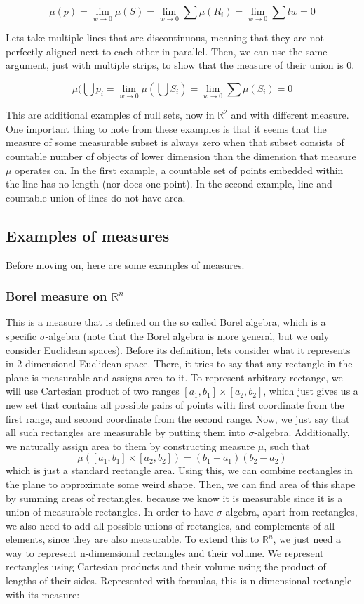 \documentclass{article}
\begin{document}
\[\mu(p)=\lim_{w \to 0}\mu(S)=\lim_{w \to 0}\sum\mu(R_i)=\lim_{w \to 0}\sum lw=0\]

Lets take multiple lines that are discontinuous, meaning that they are not perfectly aligned next to each other in parallel. Then, we can use the same argument, just with multiple strips, to show that the measure of their union is 0.

\[ \mu(\bigcup p_i = \lim_{w \to 0}\mu(\bigcup S_i) = \lim_{w \to 0}\sum\mu(S_i) = 0 \]

This are additional examples of null sets, now in $\mathbb{R}^2$ and with different measure. One important thing to note from these examples is that it seems that the measure of some measurable subset is always zero when that subset consists of countable number of objects of lower dimension than the dimension that measure $\mu$ operates on. In the first example, a countable set of points embedded within the line has no length (nor does one point). In the second example, line and countable union of lines do not have area. 

\subsection{Examples of measures}

Before moving on, here are some examples of measures.

\subsubsection{Borel measure on $\mathbb{R}^n$}
This is a measure that is defined on the so called Borel algebra, which is a specific $\sigma$-algebra (note that the Borel algebra is more general, but we only consider Euclidean spaces). Before its definition, lets consider what it represents in 2-dimensional Euclidean space. There, it tries to say that any rectangle in the plane is measurable and assigns area to it. To represent arbitrary rectange, we will use Cartesian product of two ranges $[a_1, b_1]\times[a_2, b_2]$, which just gives us a new set that contains all possible pairs of points with first coordinate from the first range, and second coordinate from the second range. Now, we just say that all such rectangles are measurable by putting them into $\sigma$-algebra. Additionally, we naturally assign area to them by constructing measure $\mu$, such that
\[\mu([a_1, b_1]\times[a_2, b_2])=(b_1-a_1)(b_2-a_2)\]
which is just a standard rectangle area. Using this, we can combine rectangles in the plane to approximate some weird shape. Then, we can find area of this shape by summing areas of rectangles, because we know it is measurable since it is a union of measurable rectangles. In order to have $\sigma$-algebra, apart from rectangles, we also need to add all possible unions of rectangles, and complements of all elements, since they are also measurable.
\newline\indent To extend this to $\mathbb{R}^n$, we just need a way to represent n-dimensional rectangles and their volume. We represent rectangles using Cartesian products and their volume using the product of lengths of their sides. Represented with formulas, this is n-dimensional rectangle with its measure:
\end{document}
